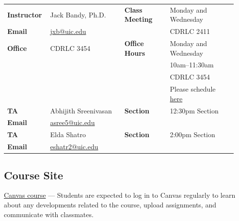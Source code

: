 \documentclass[11pt]{article}
\makeatletter
\newcommand{\taOneName}{Abhijith Sreenivasan}
\newcommand{\taOneEmail}{asree5@uic.edu}
\newcommand{\taOneSectionDesignations}{12:30pm Section}
\newcommand{\taTwoName}{Elda Shatro}
\newcommand{\taTwoEmail}{eshatr2@uic.edu}
\newcommand{\taTwoSectionDesignations}{2:00pm Section}
\newcommand{\blackboardLinkText}{Canvas course}
\newcommand{\blackboardLinkUrl}{https://canvas.uic.edu}
\makeatother
\begin{document}
\noindent
\begin{tabular}{@{}p{0.16\linewidth}p{0.31\linewidth}p{0.19\linewidth}p{0.28\linewidth}@{}}
\textbf{Instructor} & Jack Bandy, Ph.D.                       & \textbf{Class Meeting} & Monday and Wednesday \\
\textbf{Email}      & \href{mailto:jxb@uic.edu}{jxb@uic.edu} &                        & CDRLC 2411           \\
\textbf{Office}     & CDRLC 3454                              & \textbf{Office Hours}  & Monday and Wednesday \\
                    &                                         &                        & 10am--11:30am        \\
                    &                                         &                        & CDRLC 3454           \\
                    &                                         &                        & Please schedule \href{https://calendar.app.google/P3weJsBwJYiEU6Fk6}{here} \\[1.2em]
\textbf{TA}         & \taOneName                              & \textbf{Section}       & \taOneSectionDesignations \\
\textbf{Email}      & \href{mailto:\taOneEmail}{\taOneEmail}  &                        &                      \\[0.4em]
\textbf{TA}         & \taTwoName                              & \textbf{Section}       & \taTwoSectionDesignations \\
\textbf{Email}      & \href{mailto:\taTwoEmail}{\taTwoEmail}  &                        &                      \\
\end{tabular}

\vspace{0.8\baselineskip}

\subsection*{Course Site}

\href{\blackboardLinkUrl}{\blackboardLinkText} --- Students are expected to log in to Canvas regularly to learn about any developments related to the course, upload assignments, and communicate with classmates.
\end{document}
